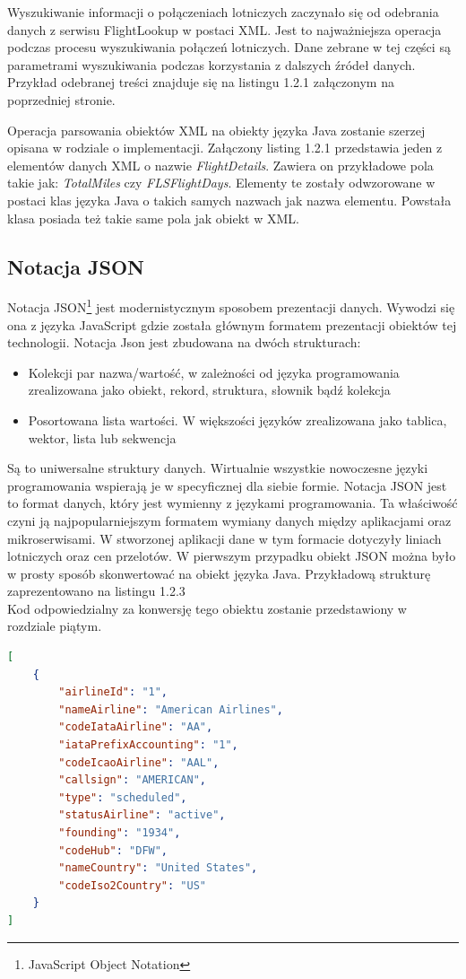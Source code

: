 \documentclass[12pt, twoside]{report}
\begin{document}
Wyszukiwanie informacji o połączeniach lotniczych zaczynało się od odebrania danych z serwisu FlightLookup w postaci XML. Jest to najważniejsza operacja podczas procesu wyszukiwania połączeń lotniczych. Dane zebrane w tej części są parametrami wyszukiwania podczas korzystania z dalszych źródeł danych. Przykład odebranej treści znajduje się na listingu 1.2.1 załączonym na poprzedniej stronie.

Operacja parsowania obiektów XML na obiekty języka Java zostanie szerzej opisana w rodziale o implementacji. Załączony listing 1.2.1 przedstawia jeden z elementów danych XML o nazwie \textit{FlightDetails}. Zawiera on przykładowe pola takie jak: \textit{TotalMiles} czy \textit{FLSFlightDays}. Elementy te zostały odwzorowane w postaci klas języka Java o takich samych nazwach jak nazwa elementu. Powstała klasa posiada też takie same pola jak obiekt w XML.
\subsection{Notacja JSON}
Notacja JSON\footnote{JavaScript Object Notation} jest modernistycznym sposobem prezentacji danych. Wywodzi się ona z języka JavaScript gdzie została głównym formatem prezentacji obiektów tej technologii. Notacja Json jest zbudowana na dwóch strukturach\cite{json}:
\begin{itemize}[noitemsep,topsep=0pt]
\item Kolekcji par nazwa/wartość, w zależności od języka programowania zrealizowana jako obiekt, rekord, struktura, słownik bądź kolekcja
\item Posortowana lista wartości. W większości języków zrealizowana jako tablica, wektor, lista lub sekwencja
\end{itemize}
Są to uniwersalne struktury danych. Wirtualnie wszystkie nowoczesne języki programowania wspierają je w specyficznej dla siebie formie. Notacja JSON jest to format danych, który jest wymienny z językami programowania. Ta właściwość czyni ją najpopularniejszym formatem wymiany danych między aplikacjami oraz mikroserwisami. W stworzonej aplikacji dane w tym formacie dotyczyły liniach lotniczych oraz cen przelotów. W pierwszym przypadku obiekt JSON można było w prosty sposób skonwertować na obiekt języka Java. Przykładową strukturę zaprezentowano na listingu 1.2.3\\
Kod odpowiedzialny za konwersję tego obiektu zostanie przedstawiony w rozdziale piątym.
\newpage
\begin{lstlisting}[language=JSON, caption= Przykładowy obiekt w notacji JSON]
   [
    {
        "airlineId": "1",
        "nameAirline": "American Airlines",
        "codeIataAirline": "AA",
        "iataPrefixAccounting": "1",
        "codeIcaoAirline": "AAL",
        "callsign": "AMERICAN",
        "type": "scheduled",
        "statusAirline": "active",
        "founding": "1934",
        "codeHub": "DFW",
        "nameCountry": "United States",
        "codeIso2Country": "US"
    }
]
\end{lstlisting}
\end{document}
